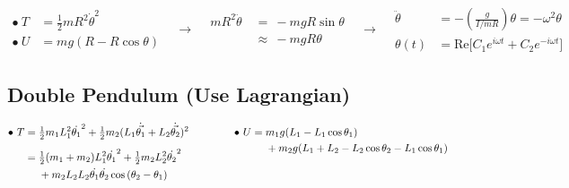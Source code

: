 \documentclass[12pt]{article}
\begin{document}
\vspace{10pt}\noindent
\hspace{10pt}\(\begin{aligned}
        \bullet\ T &= \tfrac{1}{2} m R^2 \dot{\theta}^2\\[5pt]
        \bullet\ U &= mg(R - R\cos{\theta})
    \end{aligned}
    \hspace{10pt}
    \rightarrow
    \hspace{10pt}
    \begin{aligned}
        m R^2 \ddot{\theta} &\ =\ - mgR \sin{\theta}\\
        &\ \approx\ -mgR \theta
    \end{aligned}
    \hspace{10pt}
    \rightarrow
    \hspace{10pt}
    \boxed{
        \begin{aligned}
            \ddot{\theta} & = - \left(\tfrac{g}{I/mR}\right) \theta = -\omega^2 \theta\\[5pt]
            \theta(t) &= \text{Re} \big[ C_1 e^{i\omega t} + C_2 e^{-i\omega t} \big]
        \end{aligned}
    }
\)

\vspace{15pt}
\subsection{Double Pendulum (Use Lagrangian)}

\vspace{10pt}\noindent
\hspace{10pt}\(
    \begin{aligned}[t]
        \bullet\ T &= \tfrac{1}{2}m_1 L_1^2 \dot{\theta_1}^2 
            + \tfrac{1}{2}m_2 (L_1 \dot{\vec{\theta_1}} + L_2 \dot{\vec{\theta_2}})^2\\[5pt]
        &= \begin{aligned}[t]
                &\tfrac{1}{2}(m_1+m_2) L_1^2 \dot{\theta_1}^2 + \tfrac{1}{2}m_2 L_2^2 \dot{\theta_2}^2 \\
                &+ m_2 L_2L_2 \dot{\theta_1} \dot{\theta_2} \cos{(\theta_2-\theta_1)}
            \end{aligned}
    \end{aligned}
    \hspace{1.5cm}
    \begin{aligned}[t]
        \bullet\ U &= \begin{aligned}[t]
            &m_1 g (L_1 - L_1\cos{\theta_1}) \\
            &+ m_2 g (L_1 + L_2 - L_2\cos{\theta_2} - L_1\cos{\theta_1}) 
        \end{aligned}
    \end{aligned}
\)
\end{document}
